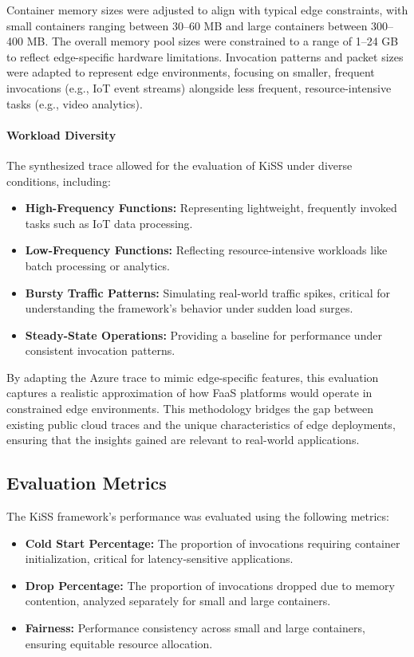 Container memory sizes were adjusted to align with typical edge constraints, with small containers ranging between 30--60 MB and large containers between 300--400 MB. The overall memory pool sizes were constrained to a range of 1--24 GB to reflect edge-specific hardware limitations. Invocation patterns and packet sizes were adapted to represent edge environments, focusing on smaller, frequent invocations (e.g., IoT event streams) alongside less frequent, resource-intensive tasks (e.g., video analytics).


\paragraph{Workload Diversity}
The synthesized trace allowed for the evaluation of KiSS under diverse conditions, including:
\begin{itemize}
    \item \textbf{High-Frequency Functions:} Representing lightweight, frequently invoked tasks such as IoT data processing.
    \item \textbf{Low-Frequency Functions:} Reflecting resource-intensive workloads like batch processing or analytics.
    \item \textbf{Bursty Traffic Patterns:} Simulating real-world traffic spikes, critical for understanding the framework’s behavior under sudden load surges.
    \item \textbf{Steady-State Operations:} Providing a baseline for performance under consistent invocation patterns.
\end{itemize}

By adapting the Azure trace to mimic edge-specific features, this evaluation captures a realistic approximation of how FaaS platforms would operate in constrained edge environments. This methodology bridges the gap between existing public cloud traces and the unique characteristics of edge deployments, ensuring that the insights gained are relevant to real-world applications.

\subsection{Evaluation Metrics}

The KiSS framework’s performance was evaluated using the following metrics:
\begin{itemize}
    \item \textbf{Cold Start Percentage:} The proportion of invocations requiring container initialization, critical for latency-sensitive applications.
    \item \textbf{Drop Percentage:} The proportion of invocations dropped due to memory contention, analyzed separately for small and large containers.
      \item \textbf{Fairness:} Performance consistency across small and large containers, ensuring equitable resource allocation.
\end{itemize}



